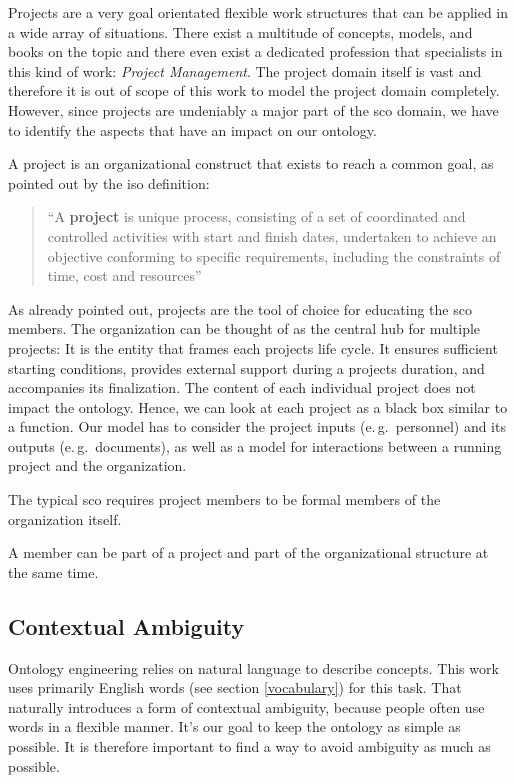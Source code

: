 \documentclass[a4paper, DIV=13, BCOR=0cm]{scrbook}
\newcommand{\eg}{e.\,g.\ }
\begin{document}
Projects are a very goal orientated flexible work structures that can be applied in a wide array of situations. There exist a multitude of concepts, models, and books on the topic and there even exist a dedicated profession that specialists in this kind of work: \textit{Project Management}. The project domain itself is vast and therefore it is out of scope of this work to model the project domain completely. However, since projects are undeniably a major part of the \gls{sco} domain, we have to identify the aspects that have an impact on our ontology. 

A project is an organizational construct that exists to reach a common goal, as pointed out by the \gls{iso} definition:

\begin{quote}
	\enquote{A \textbf{project} is unique process, consisting of a set of coordinated and controlled activities with start and finish dates, undertaken to achieve an objective conforming to specific requirements, including the constraints of time, cost and resources} \cite{iso-9000-2015}
\end{quote}

As already pointed out, projects are the tool of choice for educating the \gls{sco} members. The organization can be thought of as the central hub for multiple projects: It is the entity that frames each projects life cycle. It ensures sufficient starting conditions, provides external support during a projects duration, and accompanies its finalization. The content of each individual project does not impact the ontology. Hence, we can look at each project as a black box similar to a function. Our model has to consider the project inputs (\eg personnel) and its outputs (\eg documents), as well as a model for interactions between a running project and the organization.

\begin{compactenum}
	\item The typical \gls{sco} requires project members to be formal members of the organization itself.
	\item A member can be part of a project and part of the organizational structure at the same time.
\end{compactenum}

\subsection{Contextual Ambiguity}
Ontology engineering relies on natural language to describe concepts. This work uses primarily English words (see section \ref{vocabulary}) for this task. That naturally introduces a form of contextual ambiguity, because people often use words in a flexible manner. \cite[p.\,7, 1.5.2]{uschold1998enterprise}  It's our goal to keep the ontology as simple as possible. It is therefore important to find a way to avoid ambiguity as much as possible.
\end{document}
